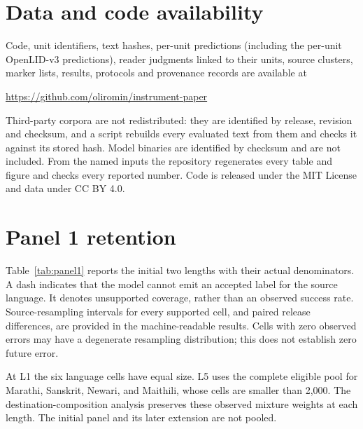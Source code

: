 \documentclass[final]{clv2025}
\newcommand{\fitexhibit}[1]{\sbox{\exhibitbox}{}\ifdim\wd\exhibitbox>\linewidth\resizebox{\linewidth}{!}{\usebox{\exhibitbox}}\else\usebox{\exhibitbox}\fi}
\newcommand{\exhibit}[1]{\fitexhibit{tables/#1.tex}}
\begin{document}
\section*{Data and code availability}
Code, unit identifiers, text hashes, per-unit predictions (including the per-unit OpenLID-v3 predictions), reader judgments linked to their units, source clusters, marker lists, results, protocols and provenance records are available at
\begin{center}\url{https://github.com/oliromin/instrument-paper}\end{center}
Third-party corpora are not redistributed: they are identified by release, revision and checksum, and a script rebuilds every evaluated text from them and checks it against its stored hash. Model binaries are identified by checksum and are not included. From the named inputs the repository regenerates every table and figure and checks every reported number. Code is released under the MIT License and data under CC BY 4.0.



\clearpage\appendix
\renewcommand{\thesection}{\Alph{section}}
\renewcommand{\theHsection}{appendix.\Alph{section}}
\FloatBarrier
\section{Panel 1 retention}\label{app:panel1}

Table~\ref{tab:panel1} reports the initial two lengths with their actual denominators. A dash indicates that the model cannot emit an accepted label for the source language. It denotes unsupported coverage, rather than an observed success rate. Source-resampling intervals for every supported cell, and paired release differences, are provided in the machine-readable results. Cells with zero observed errors may have a degenerate resampling distribution; this does not establish zero future error.

\begin{table}[htbp]
\centering\small\setlength{\tabcolsep}{4pt}
\exhibit{panel1_retention}
\caption{Retention on Panel 1. Rates are rounded from exact counts to three decimal places using a consistent half-up convention. Apparent values of 1.000 can therefore include a small nonzero loss; exact counts accompany the table in the repository.}
\label{tab:panel1}
\end{table}

At L1 the six language cells have equal size. L5 uses the complete eligible pool for Marathi, Sanskrit, Newari, and Maithili, whose cells are smaller than 2,000. The destination-composition analysis preserves these observed mixture weights at each length. The initial panel and its later extension are not pooled.
\end{document}
